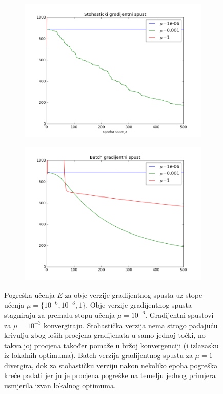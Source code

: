 \documentclass[paper=a4, fontsize=11pt]{scrartcl} %
\numberwithin{equation}{section} %
\numberwithin{figure}{section} %
\numberwithin{table}{section} %
\begin{document}
\begin{figure}[h]
\centering
\begin{subfigure}[b]{0.7\textwidth}
\includegraphics[width=\textwidth]{img/zad8_1.png}
\end{subfigure}
\begin{subfigure}[b]{0.7\textwidth}
\includegraphics[width=\textwidth]{img/zad8_2.png}
\end{subfigure}
\caption{Pogreška učenja $E$ za obje verzije gradijentnog spusta uz stope učenja $\mu=\{10^{-6}, 10^{-3}, 1\}$.
Obje verzije gradijentnog spusta stagniraju za premalu stopu učenja $\mu=10^{-6}$.  Gradijentni spustovi za $\mu=10^{-3}$ konvergiraju. Stohastička verzija nema strogo padajuću krivulju zbog loših procjena gradijenata u samo jednoj točki, no takva joj procjena također pomaže u bržoj konvergenciji (i izlazasku iz lokalnih optimuma).
Batch verzija gradijentnog spustu za $\mu = 1$ divergira, dok za stohastičku verziju nakon nekoliko epoha pogreška kreće padati jer ju je procjena pogreške na temelju jednog primjera usmjerila izvan lokalnog optimuma.}
\end{figure}
\end{document}
